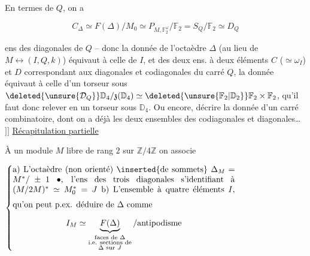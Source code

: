 En termes de $Q$, on a

\[
 C_\Delta\simeq F(\Delta)/M_0\simeq P_{M,\mathbb F_2^{\underline\omega}}/\mathbb F_2=S_Q/\mathbb F_2\simeq D_Q
\]

ens des diagonales de $Q$ -- donc la donnée de l'octaèdre $\Delta$ (au lieu de $M\longleftrightarrow(I,Q,k)$) équivaut à celle de $I$, et des deux ens. à deux éléments $C$ ($\simeq\omega_I$) et $D$ correspondant aux diagonales et codiagonales du carré $Q$,  la donnée équivaut à celle d'un torseur sous $\deleted{\unsure{\mathcal D_Q}}\mathbb D_4/\mathfrak z(\mathbb D_4)\simeq\deleted{\unsure{\mathbb F_2|\mathbb D_2}}\mathbb F_2\times\mathbb F_2$, qu'il faut donc relever en un torseur sous $\mathbb D_4$. Ou encore, décrire la donnée d'un carré combinatoire, dont on a déjà les deux ensembles  des codiagonales et diagonales\ldots\ $]\!]$
\uline{Récapitulation partielle}

À un module $M$ libre de rang $2$ sur $\mathbb Z/4\mathbb Z$ on associe

\noindent{}\(\left\{\begin{minipage}{.77\linewidth}
a) L'octaèdre (non orienté) \inserted{de sommets} $\Delta_M=M^*/\pm1\ \bullet$, l'ens des trois diagonales s'identifiant à $(M/2M)^*\simeq M_0^*=J$

\medskip b) L'ensemble à quatre éléments $I$, qu'on peut p.ex. déduire de $\Delta$ comme
\[
 I_M\simeq\underbrace{F(\Delta)}_{\substack{\text{faces de }\Delta\\\text{i.e. sections de}\\\Delta\text{ sur }J}}/\text{antipodisme}
\]
\end{minipage}\right.\)

\reversemarginpar{}\normalmarginpar


